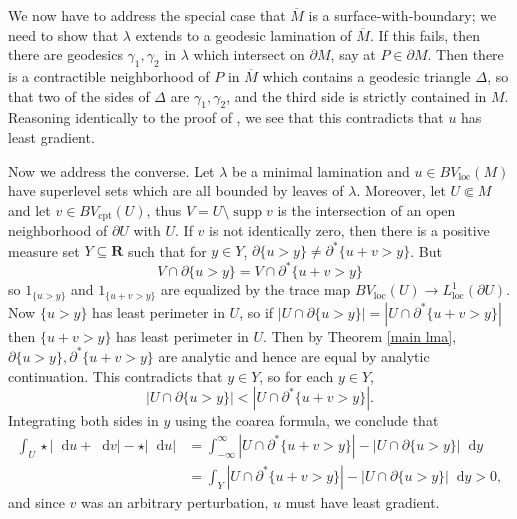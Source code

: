 \documentclass[reqno,10pt]{amsart}
\newcommand{\RR}{\mathbf{R}}
\DeclareMathOperator{\supp}{supp}
\newcommand*\dif{\mathop{}\!\mathrm{d}}
\newcommand{\loc}{\mathrm{loc}}
\newcommand{\cpt}{\mathrm{cpt}}
\theoremstyle{definition}
\numberwithin{equation}{section}
\begin{document}
We now have to address the special case that $\overline M$ is a surface-with-boundary; we need to show that $\lambda$ extends to a geodesic lamination of $\overline M$.
If this fails, then there are geodesics $\gamma_1, \gamma_2$ in $\lambda$ which intersect on $\partial M$, say at $P \in \partial M$.
Then there is a contractible neighborhood of $P$ in $\overline M$ which contains a geodesic triangle $\Delta$, so that two of the sides of $\Delta$ are $\gamma_1, \gamma_2$, and the third side is strictly contained in $M$.
Reasoning identically to the proof of \cite[Proposition 3.5]{górny2017planar}, we see that this contradicts that $u$ has least gradient.

Now we address the converse.
Let $\lambda$ be a minimal lamination and $u \in BV_\loc(M)$ have superlevel sets which are all bounded by leaves of $\lambda$.
Moreover, let $U \Subset M$ and let $v \in BV_\cpt(U)$, thus $V = U \setminus \supp v$ is the intersection of an open neighborhood of $\partial U$ with $U$.
If $v$ is not identically zero, then there is a positive measure set $Y \subseteq \RR$ such that for $y \in Y$, $\partial \{u > y\} \neq \partial^* \{u + v > y\}$.
But
$$V \cap \partial \{u > y\} = V \cap \partial^* \{u + v > y\}$$
so $1_{\{u > y\}}$ and $1_{\{u + v > y\}}$ are equalized by the trace map $BV_\loc(U) \to L^1_\loc(\partial U)$.
Now $\{u > y\}$ has least perimeter in $U$, so if $|U \cap \partial \{u > y\}| = |U \cap \partial^* \{u + v > y\}|$ then $\{u + v > y\}$ has least perimeter in $U$. Then by Theorem \ref{main lma}, $\partial \{u > y\}, \partial^* \{u + v > y\}$ are analytic and hence are equal by analytic continuation.
This contradicts that $y \in Y$, so for each $y \in Y$,
$$|U \cap \partial \{u > y\}| < |U \cap \partial^* \{u + v > y\}|.$$
Integrating both sides in $y$ using the coarea formula, we conclude that 
\begin{align*}
\int_U \star |\dif u + \dif v| - \star |\dif u| &= \int_{-\infty}^\infty |U \cap \partial^* \{u + v > y\}| - |U \cap \partial \{u > y\}| \dif y \\
&= \int_Y |U \cap \partial^* \{u + v > y\}| - |U \cap \partial \{u > y\}| \dif y > 0,
\end{align*}
and since $v$ was an arbitrary perturbation, $u$ must have least gradient.
\end{document}
